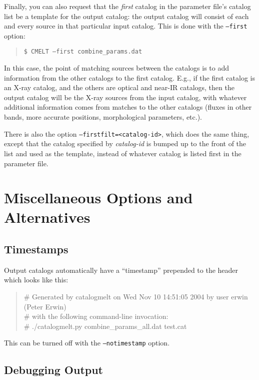 \documentclass[10pt]{article}
\begin{document}
Finally, you can also request that the \textit{first} catalog in the
parameter file's catalog list be a template for the output catalog:
the output catalog will consist of each and every source in that
particular input catalog.  This is done with the  \texttt{--first} option:
\begin{quote}
  \texttt{\$ CMELT~--first~combine\_params.dat}
\end{quote}
In this case, the point of matching sources between the catalogs is to
add information from the other catalogs to the first catalog.  E.g.,
if the first catalog is an X-ray catalog, and the others are optical
and near-IR catalogs, then the output catalog will be the X-ray
sources from the input catalog, with whatever additional information
comes from matches to the other catalogs (fluxes in other bands, more
accurate positions, morphological parameters, etc.).

There is also the option \texttt{--firstfilt=<catalog-id>}, which does
the same thing, except that the catalog specified by
\textit{catalog-id} is bumped up to the front of the list and used as 
the template, instead of whatever catalog is listed first in the 
parameter file.


\section{Miscellaneous Options and Alternatives}

\subsection{Timestamps}

Output catalogs automatically have a ``timestamp'' prepended to the 
header which looks like this:
\begin{quote}
\# Generated by catalogmelt on Wed Nov 10 14:51:05 2004 by user erwin (Peter Erwin) \\
\# with the following command-line invocation: \\
\#      ./catalogmelt.py combine\_params\_all.dat test.cat \\
\end{quote}

This can be turned off with the \texttt{--notimestamp} option.


\subsection{Debugging Output}
\end{document}
